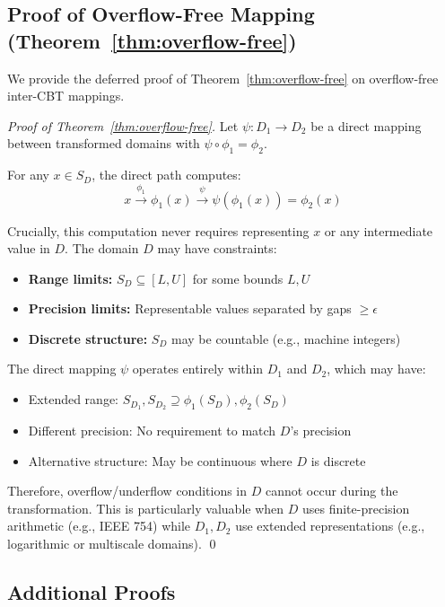 \documentclass[11pt]{article}
\theoremstyle{definition}
\begin{document}
\subsection{Proof of Overflow-Free Mapping (Theorem~\ref{thm:overflow-free})}

We provide the deferred proof of Theorem~\ref{thm:overflow-free} on overflow-free inter-CBT mappings.

\begin{proof}[Proof of Theorem~\ref{thm:overflow-free}]
Let $\psi: D_1 \to D_2$ be a direct mapping between transformed domains with $\psi \circ \phi_1 = \phi_2$. 

For any $x \in S_D$, the direct path computes:
\[x \xrightarrow{\phi_1} \phi_1(x) \xrightarrow{\psi} \psi(\phi_1(x)) = \phi_2(x)\]

Crucially, this computation never requires representing $x$ or any intermediate value in $D$. The domain $D$ may have constraints:
\begin{itemize}
\item \textbf{Range limits:} $S_D \subseteq [L, U]$ for some bounds $L, U$
\item \textbf{Precision limits:} Representable values separated by gaps $\geq \epsilon$
\item \textbf{Discrete structure:} $S_D$ may be countable (e.g., machine integers)
\end{itemize}

The direct mapping $\psi$ operates entirely within $D_1$ and $D_2$, which may have:
\begin{itemize}
\item Extended range: $S_{D_1}, S_{D_2} \supseteq \phi_1(S_D), \phi_2(S_D)$
\item Different precision: No requirement to match $D$'s precision
\item Alternative structure: May be continuous where $D$ is discrete
\end{itemize}

Therefore, overflow/underflow conditions in $D$ cannot occur during the transformation. This is particularly valuable when $D$ uses finite-precision arithmetic (e.g., IEEE 754) while $D_1, D_2$ use extended representations (e.g., logarithmic or multiscale domains). \qed
\end{proof}

\subsection{Additional Proofs}
\end{document}
